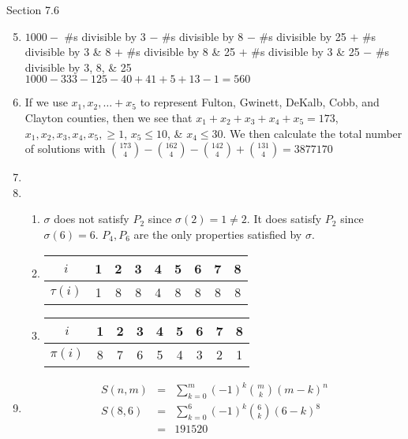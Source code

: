 \documentclass[12pt]{article}
\newcommand{\s}[1]{\setcounter{enumi}{#1}}
\begin{document}
Section 7.6

\begin{enumerate}
  \s{4}
  
  \item $1000 - $ \#s divisible by 3 $ - $ \#s divisible by 8 $ - $ \#s divisible by 25 $ + $ \#s divisible by 3 \& 8 $ + $ \#s divisible by 8 \& 25 $ + $ \#s divisible by 3 \& 25 $ - $ \#s divisible by 3, 8, \& 25\\
    $1000 - 333 - 125 - 40 + 41 + 5 + 13 - 1 = 560$

  \item If we use $x_1, x_2, \dots + x_5$ to represent Fulton, Gwinett, DeKalb, Cobb, and Clayton counties, then we see that $x_1 + x_2 + x_3 + x_4 + x_5 = 173$, $x_1, x_2, x_3, x_4, x_5, \ge 1$, $x_5 \le 10$, \& $x_4 \le 30$. We then calculate the total number of solutions with $\binom{173}{4} - \binom{162}{4} - \binom{142}{4} + \binom{131}{4} = 3877170$
  
  \s{7}
  
  \item

  \s{11}
  
  \item
    \begin{enumerate}
      \item $\sigma$ does not satisfy $P_2$ since $\sigma\left(2\right) = 1 \neq 2$. It does satisfy $P_2$ since $\sigma\left(6\right) = 6$. $P_4, P_6$ are the only properties satisfied by $\sigma$.
      \item
        \begin{tabular}{c|c|c|c|c|c|c|c|c}
          $i$                   & 1 & 2 & 3 & 4 & 5 & 6 & 7 & 8 \\ \hline
          $\tau\left(i\right)$  & 1 & 8 & 8 & 4 & 8 & 8 & 8 & 8 \\
        \end{tabular}
      \item
        \begin{tabular}{c|c|c|c|c|c|c|c|c}
          $i$                 & 1 & 2 & 3 & 4 & 5 & 6 & 7 & 8 \\ \hline
          $\pi\left(i\right)$ & 8 & 7 & 6 & 5 & 4 & 3 & 2 & 1 \\
        \end{tabular}
    \end{enumerate}

  \s{13}

  \item
    \begin{eqnarray*}
      S\left(n, m\right) & = & \sum^m_{k=0} \left(-1\right)^k \binom{m}{k} \left(m - k\right)^n \\
      S\left(8, 6\right) & = & \sum^6_{k=0} \left(-1\right)^k \binom{6}{k} \left(6 - k\right)^8 \\
                         & = & 191520\\
    \end{eqnarray*}


\end{enumerate}
\end{document}
